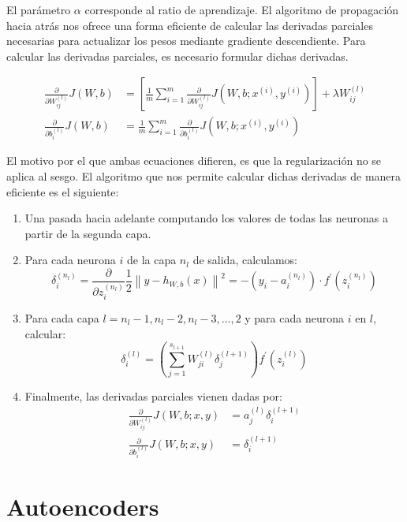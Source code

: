 \documentclass[
  12pt,
  a4paperpaper,
]{report}
\providecommand{\tightlist}{%
  \setlength{\itemsep}{0pt}\setlength{\parskip}{0pt}}
\begin{document}
El parámetro \(\alpha\) corresponde al ratio de aprendizaje. El
algoritmo de propagación hacia atrás nos ofrece una forma eficiente de
calcular las derivadas parciales necesarias para actualizar los pesos
mediante gradiente descendiente. Para calcular las derivadas parciales,
es necesario formular dichas derivadas.

\[
\begin{aligned}
\frac{\partial}{\partial W_{i j}^{(l)}} J(W, b) &=\left[\frac{1}{m} \sum_{i=1}^{m} \frac{\partial}{\partial W_{i j}^{(l)}} J\left(W, b ; x^{(i)}, y^{(i)}\right)\right]+\lambda W_{i j}^{(l)} \\
\frac{\partial}{\partial b_{i}^{(l)}} J(W, b) &=\frac{1}{m} \sum_{i=1}^{m} \frac{\partial}{\partial b_{i}^{(l)}} J\left(W, b ; x^{(i)}, y^{(i)}\right)
\end{aligned}
\]

El motivo por el que ambas ecuaciones difieren, es que la regularización
no se aplica al sesgo. El algoritmo que nos permite calcular dichas
derivadas de manera eficiente es el siguiente:

\begin{enumerate}
\def\labelenumi{\arabic{enumi}.}
\tightlist
\item
  Una pasada hacia adelante computando los valores de todas las neuronas
  a partir de la segunda capa.
\item
  Para cada neurona \(i\) de la capa \(n_l\) de salida, calculamos:
  \[\delta_{i}^{\left(n_{l}\right)}=\frac{\partial}{\partial z_{i}^{\left(n_{l}\right)}} \frac{1}{2}\left\|y-h_{W, b}(x)\right\|^{2}=-\left(y_{i}-a_{i}^{\left(n_{l}\right)}\right) \cdot f^{\prime}\left(z_{i}^{\left(n_{l}\right)}\right)\]
\item
  Para cada capa \(l=n_{l}-1, n_{l}-2, n_{l}-3, \dots, 2\) y para cada
  neurona \(i\) en \(l\), calcular:
  \[\delta_{i}^{(l)}=\left(\sum_{j=1}^{s_{l+1}} W_{j i}^{(l)} \delta_{j}^{(l+1)}\right) f^{\prime}\left(z_{i}^{(l)}\right)\]
\item
  Finalmente, las derivadas parciales vienen dadas por: \[
   \begin{aligned}
   \frac{\partial}{\partial W_{i j}^{(l)}} J(W, b ; x, y) &=a_{j}^{(l)} \delta_{i}^{(l+1)} \\
   \frac{\partial}{\partial b_{i}^{(l)}} J(W, b ; x, y) &=\delta_{i}^{(l+1)}
   \end{aligned}
   \]
\end{enumerate}

\hypertarget{autoencoders}{%
\section{Autoencoders}\label{autoencoders}}
\end{document}
